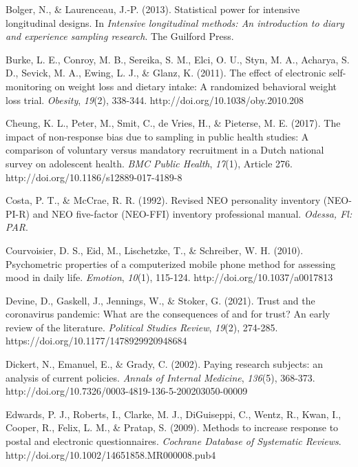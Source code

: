 \documentclass[authordate, empirical]{jote-new-article}
\begin{document}
	Bolger, N., \& Laurenceau, J.-P. (2013). Statistical power for intensive longitudinal designs. In \emph{Intensive longitudinal methods: An introduction to diary and experience sampling research}. The Guilford Press.



	Burke, L. E., Conroy, M. B., Sereika, S. M., Elci, O. U., Styn, M. A., Acharya, S. D., Sevick, M. A., Ewing, L. J., \& Glanz, K. (2011). The effect of electronic self-monitoring on weight loss and dietary intake: A randomized behavioral weight loss trial. \emph{Obesity},\emph{ 19}(2), 338-344. http://doi.org/10.1038/oby.2010.208



	Cheung, K. L., Peter, M., Smit, C., de Vries, H., \& Pieterse, M. E. (2017). The impact of non-response bias due to sampling in public health studies: A comparison of voluntary versus mandatory recruitment in a Dutch national survey on adolescent health. \emph{BMC Public Health},\emph{ 17}(1), Article 276. http://doi.org/10.1186/s12889-017-4189-8



	Costa, P. T., \& McCrae, R. R. (1992). Revised NEO personality inventory (NEO-PI-R) and NEO five-factor (NEO-FFI) inventory professional manual. \emph{Odessa, Fl: PAR}.



	Courvoisier, D. S., Eid, M., Lischetzke, T., \& Schreiber, W. H. (2010). Psychometric properties of a computerized mobile phone method for assessing mood in daily life. \emph{Emotion},\emph{ 10}(1), 115-124. http://doi.org/10.1037/a0017813



	Devine, D., Gaskell, J., Jennings, W., \& Stoker, G. (2021). Trust and the coronavirus pandemic: What are the consequences of and for trust? An early review of the literature. \emph{Political Studies Review},\emph{ 19}(2), 274-285. https://doi.org/10.1177/1478929920948684



	Dickert, N., Emanuel, E., \& Grady, C. (2002). Paying research subjects: an analysis of current policies. \emph{Annals of Internal Medicine},\emph{ 136}(5), 368-373. http://doi.org/10.7326/0003-4819-136-5-200203050-00009



	Edwards, P. J., Roberts, I., Clarke, M. J., DiGuiseppi, C., Wentz, R., Kwan, I., Cooper, R., Felix, L. M., \& Pratap, S. (2009). Methods to increase response to postal and electronic questionnaires. \emph{Cochrane Database of Systematic Reviews}. http://doi.org/10.1002/14651858.MR000008.pub4
\end{document}
